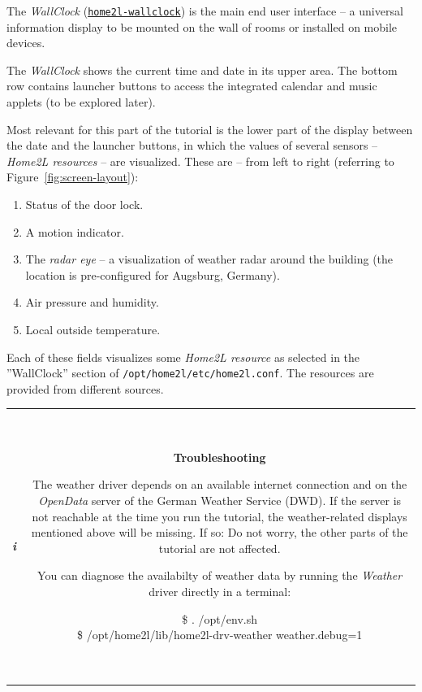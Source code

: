 \documentclass[12pt,english,parskip=half]{scrreprt}
\newcommand{\lstbox}[1]{
  \par
  \colorbox{lstbackground}{\ttfamily\footnotesize{\parbox{\linewidth}{#1}}}
  \par
}
\newcommand{\infobox}[1]{
  \hfill
  \setlength\arrayrulewidth{1pt}
  \begin{tabular}[t]{c|c|}
    \parbox{1.8em}{\hfill\textit{\Huge\textbf{i}\,}}
    &
    \,\parbox{0.89\linewidth}{\setlength{\parskip}{0.5em}#1}\,
  \end{tabular}
  \par
}
\newcommand{\idx}[1]{#1\index{#1}}
\newcommand{\toolref}[1]{\hyperref[tool:#1]{\texttt{\idx{#1}}}}
\begin{document}
The \emph{WallClock} (\toolref{home2l-wallclock}) is the main end user interface --
a universal information display to be mounted on the wall of rooms or installed on mobile devices.

The \emph{WallClock} shows the current time and date in its upper area.
The bottom row contains launcher buttons to access the integrated
calendar and music applets (to be explored later).

Most relevant for this part of the tutorial is the lower part of the
display between the date and the launcher buttons, in which the values of
several sensors -- \emph{Home2L resources} -- are visualized.
These are -- from left to right (referring to Figure~\ref{fig:screen-layout}):

\begin{enumerate}
\item
  Status of the door lock.
\item
  A motion indicator.
\item
  The \emph{radar eye} -- a visualization of weather radar around the building
  (the location is pre-configured for Augsburg, Germany).
\item
  Air pressure and humidity.
\item
  Local outside temperature.
\end{enumerate}

Each of these fields visualizes some \emph{Home2L resource} as
selected in the ''WallClock'' section of \texttt{/opt/home2l/etc/home2l.conf}.
The resources are provided from different sources.


\infobox{
  \textbf{Troubleshooting}

  The weather driver depends on an available internet connection and on the \textit{OpenData} server of
  the German Weather Service (DWD). If the server is not reachable at the time you run the
  tutorial, the weather-related displays mentioned above will be missing. If so: Do not worry, the other
  parts of the tutorial are not affected.

  You can diagnose the availabilty of weather data by running the \emph{Weather} driver directly
  in a terminal:
  \lstbox{
    \$ . /opt/env.sh\\
    \$ /opt/home2l/lib/home2l-drv-weather weather.debug=1
  }
}
\end{document}
